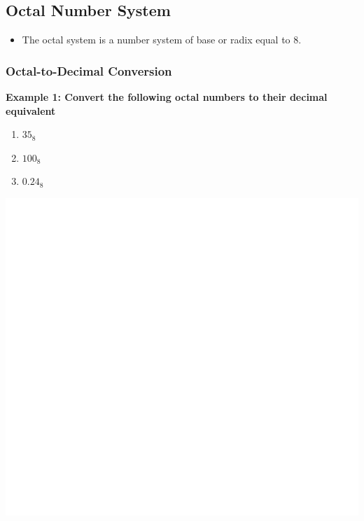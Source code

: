 \documentclass[]{book}
\providecommand{\tightlist}{%
  \setlength{\itemsep}{0pt}\setlength{\parskip}{0pt}}
\begin{document}
\hypertarget{octal-number-system}{%
\subsection{Octal Number System}\label{octal-number-system}}

\begin{itemize}
\tightlist
\item
  The octal system is a number system of base or radix equal to 8.
\end{itemize}

\hypertarget{octal-to-decimal-conversion}{%
\subsubsection{Octal-to-Decimal Conversion}\label{octal-to-decimal-conversion}}

\textbf{Example 1: Convert the following octal numbers to their decimal equivalent}

\begin{enumerate}
\def\labelenumi{(\alph{enumi})}
\tightlist
\item
  \(35_8\)
\item
  \(100_8\)
\item
  \(0.24_8\)
\end{enumerate}

\begin{center}\includegraphics[width=1\linewidth]{figure/NSbox9-1} \end{center}
\end{document}
